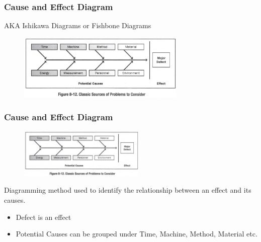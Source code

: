 \begin{frame}
\frametitle{Cause and Effect Diagram}
AKA Ishikawa Diagrams or Fishbone Diagrams\\
\begin{figure}
	\centering
		\includegraphics[width = 8cm]{images/ish.jpg}
	\label{fig:isha}
\end{figure}

\end{frame}




\begin{frame}
\frametitle{Cause and Effect Diagram}
\begin{figure}
	\centering
		\includegraphics[width = 6cm]{images/ish.jpg}
	\label{fig:ishb}
\end{figure}
Diagramming method used to identify the relationship between an effect and its causes.\\
\begin{itemize}
	\item Defect is an effect
	\item Potential Causes can be grouped under Time, Machine, Method, Material etc.
\end{itemize}
\end{frame}




